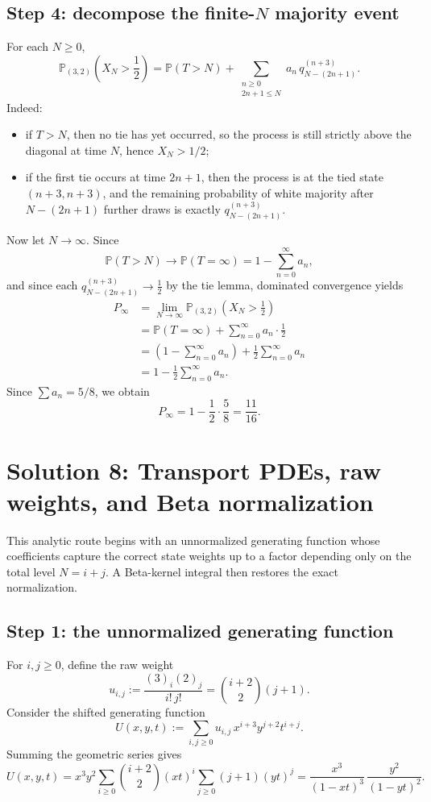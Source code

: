 \documentclass[12pt]{article}
\begin{document}
\subsection*{Step 4: decompose the finite-$N$ majority event}
For each $N\ge 0$,
\[
\mathbb{P}_{(3,2)}\!\left(X_N>\frac12\right)
=
\mathbb{P}(T>N)
+
\sum_{\substack{n\ge 0\\2n+1\le N}}
a_n\, q_{N-(2n+1)}^{(n+3)}.
\]
Indeed:
\begin{itemize}
    \item if $T>N$, then no tie has yet occurred, so the process is still strictly above the diagonal at time $N$, hence $X_N>1/2$;
    \item if the first tie occurs at time $2n+1$, then the process is at the tied state $(n+3,n+3)$, and the remaining probability of white majority after $N-(2n+1)$ further draws is exactly $q_{N-(2n+1)}^{(n+3)}$.
\end{itemize}

Now let $N\to\infty$. Since
\[
\mathbb{P}(T>N)\longrightarrow \mathbb{P}(T=\infty)=1-\sum_{n=0}^\infty a_n,
\]
and since each $q_{N-(2n+1)}^{(n+3)}\to \tfrac12$ by the tie lemma, dominated convergence yields
\begin{align*}
P_\infty
&=
\lim_{N\to\infty}\mathbb{P}_{(3,2)}\!\left(X_N>\frac12\right) \\
&=
\mathbb{P}(T=\infty)
+
\sum_{n=0}^\infty a_n\cdot \frac12 \\
&=
\left(1-\sum_{n=0}^\infty a_n\right)+\frac12\sum_{n=0}^\infty a_n \\
&=
1-\frac12\sum_{n=0}^\infty a_n.
\end{align*}
Since $\sum a_n=5/8$, we obtain
\[
P_\infty
=
1-\frac12\cdot\frac58
=
\frac{11}{16}.
\]

\section{Solution 8: Transport PDEs, raw weights, and Beta normalization}

This analytic route begins with an unnormalized generating function whose coefficients capture the correct state weights up to a factor depending only on the total level $N=i+j$. A Beta-kernel integral then restores the exact normalization.

\subsection*{Step 1: the unnormalized generating function}
For $i,j\ge 0$, define the raw weight
\[
u_{i,j}:=\frac{(3)_i(2)_j}{i!\,j!}
=
\binom{i+2}{2}(j+1).
\]
Consider the shifted generating function
\[
U(x,y,t):=\sum_{i,j\ge 0} u_{i,j}\,x^{i+3}y^{j+2}t^{i+j}.
\]
Summing the geometric series gives
\[
U(x,y,t)
=
x^3y^2\sum_{i\ge 0}\binom{i+2}{2}(xt)^i
\sum_{j\ge 0}(j+1)(yt)^j
=
\frac{x^3}{(1-xt)^3}\,\frac{y^2}{(1-yt)^2}.
\]
\end{document}
